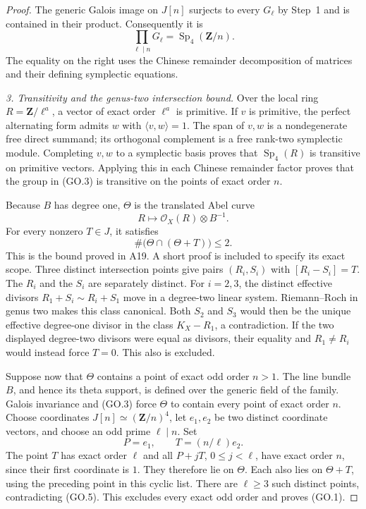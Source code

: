 \begin{proof}
The generic Galois image on $J[n]$ surjects to every
$G_\ell$ by Step~1 and is contained in their product.
Consequently it is
\[
            \prod_{\ell\mid n}G_\ell
                  =\operatorname{Sp}_4(\mathbf Z/n).         \tag{GO.3}
\]
The equality on the right uses the Chinese remainder
decomposition of matrices and their defining symplectic
equations.

\emph{3. Transitivity and the genus-two intersection bound.}
Over the local ring $R=\mathbf Z/\ell^a$, a vector of exact
order $\ell^a$ is primitive.  If $v$ is primitive, the
perfect alternating form admits $w$ with
$\langle v,w\rangle=1$.  The span of $v,w$ is a
nondegenerate free direct summand; its orthogonal
complement is a free rank-two symplectic module.
Completing $v,w$ to a symplectic basis proves that
$\operatorname{Sp}_4(R)$ is transitive on primitive
vectors.  Applying this in each Chinese remainder factor
proves that the group in (GO.3) is transitive on the
points of exact order $n$.

Because $B$ has degree one, $\Theta$ is the translated
Abel curve
\[
                 R\longmapsto\mathcal O_X(R)\otimes B^{-1}.
                                                               \tag{GO.4}
\]
For every nonzero $T\in J$, it satisfies
\[
                   \#\bigl(\Theta\cap(\Theta+T)\bigr)\le2.
                                                               \tag{GO.5}
\]
This is the bound proved in A19.  A short proof is included
to specify its exact scope.  Three distinct intersection
points give pairs $(R_i,S_i)$ with $[R_i-S_i]=T$.
The $R_i$ and the $S_i$ are separately distinct.  For
$i=2,3$, the distinct effective divisors
$R_1+S_i\sim R_i+S_1$ move in a degree-two linear system.
Riemann--Roch in genus two makes this class canonical.
Both $S_2$ and $S_3$ would then be the unique effective
degree-one divisor in the class $K_X-R_1$, a contradiction.
If the two displayed degree-two divisors were equal as
divisors, their equality and $R_1\ne R_i$ would instead
force $T=0$.  This also is excluded.

Suppose now that $\Theta$ contains a point of exact odd
order $n>1$.  The line bundle $B$, and hence its theta
support, is defined over the generic field of the family.
Galois invariance and (GO.3) force $\Theta$ to contain
every point of exact order $n$.  Choose coordinates
$J[n]\simeq(\mathbf Z/n)^4$, let $e_1,e_2$ be two
distinct coordinate vectors, and choose an odd prime
$\ell\mid n$.  Set
\[
                   P=e_1,\qquad T=(n/\ell)e_2.
\]
The point $T$ has exact order $\ell$ and all
$P+jT$, $0\le j<\ell$, have exact order $n$, since their
first coordinate is $1$.  They therefore lie on $\Theta$.
Each also lies on $\Theta+T$, using the preceding point
in this cyclic list.  There are $\ell\ge3$ such distinct
points, contradicting (GO.5).  This excludes every exact
odd order and proves (GO.1).


\end{proof}
